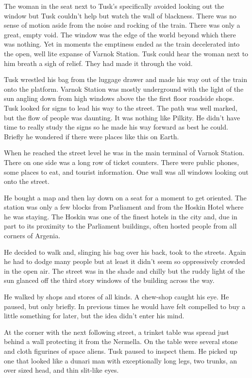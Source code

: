 The woman in the seat next to Tusk's specifically avoided looking out the window but Tusk
couldn't help but watch the wall of blackness. There was no sense of motion aside from the noise
and rocking of the train. There was only a great, empty void. The window was the edge of the
world beyond which there was nothing. Yet in moments the emptiness ended as the train
decelerated into the open, well lite expanse of Varnok Station. Tusk could hear the woman next
to him breath a sigh of relief. They had made it through the void.

Tusk wrestled his bag from the luggage drawer and made his way out of the train onto the
platform. Varnok Station was mostly underground with the light of the sun angling down from high
windows above the the first floor roadside shops. Tusk looked for signs to lead his way to the
street. The path was well marked, but the flow of people was daunting. It was nothing like
Pilkity. He didn't have time to really study the signs so he made his way forward as best he
could. Briefly he wondered if there were places like this on Earth.

When he reached the street level he was in the main terminal of Varnok Station. There on one
side was a long row of ticket counters. There were public phones, some places to eat, and
tourist information. One wall was all windows looking out onto the street.

He bought a map and then lay down on a seat for a moment to get oriented. The station was only a
few blocks from Parliament and from the Hoskin Hotel where he was staying. The Hoskin was one of
the finest hotels in the city and, due in part to its proximity to the Parliament buildings,
often hosted people from all corners of Argenia.

He decided to walk and, slinging his bag over his back, took to the streets. Again he had to
dodge many people but at least it didn't seem so oppressively crowded in the open air. The
street was in the shade and chilly but the ruddy light of the sun glanced off the third story
windows of the building across the way.

He walked by shops and stores of all kinds. A chew-shop caught his eye. He paused, but only
briefly. In previous times he would have felt compelled to buy a little something for later, but
the idea didn't enter his mind.

At the corner with the next following street, a trinket table was spread just behind a wall
protecting it from the Nermella. On the table were several stone and cloth figurines of space
aliens. Tusk paused to inspect them. He picked up one that looked like a dunari man with
exceptionally long legs, two trunks, an over sized head, and thin slit-like eyes.

